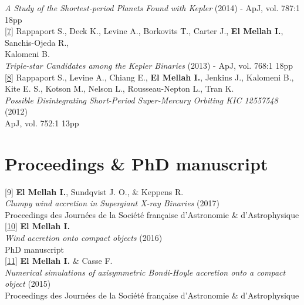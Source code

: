 \begin{flushleft}
\emph{A Study of the Shortest-period Planets Found with Kepler} (2014) - ApJ, vol. 787:1 18pp\\ 
\vspace*{0.3cm}
\href{http://iopscience.iop.org/article/10.1088/0004-637X/768/1/33/meta}{[7]} Rappaport S., Deck K., Levine A., Borkovits T., Carter J., \textbf{El Mellah I.}, Sanchis-Ojeda R., \\ Kalomeni B.\\ 
\emph{Triple-star Candidates among the Kepler Binaries} (2013) - ApJ, vol. 768:1 18pp\\
\vspace*{0.3cm}
\href{http://iopscience.iop.org/article/10.1088/0004-637X/752/1/1}{[8]} Rappaport S., Levine A., Chiang E., \textbf{El Mellah I.}, Jenkins J., Kalomeni B.,\\
Kite E. S., Kotson M., Nelson L., Rousseau-Nepton L., Tran K. \\ 
\emph{Possible Disintegrating Short-Period Super-Mercury Orbiting KIC 12557548} (2012)\\
ApJ, vol. 752:1 13pp \\

\end{flushleft}

\section*{Proceedings \& PhD manuscript}

\begin{flushleft}

[9] \textbf{El Mellah I.}, Sundqvist J. O., \& Keppens R. \\ 
\emph{Clumpy wind accretion in Supergiant X-ray Binaries} (2017)\\
Proceedings des Journ\'ees de la Soci\'et\'e fran\c caise d'Astronomie \& d'Astrophysique\\
\vspace*{0.3cm}
\href{http://adsabs.harvard.edu/abs/2017arXiv170709165E}{[10]} \textbf{El Mellah I.}\\ 
\emph{Wind accretion onto compact objects} (2016)\\
PhD manuscript\\
\vspace*{0.3cm}
\href{http://adsabs.harvard.edu/abs/2015sf2a.conf..325E}{[11]} \textbf{El Mellah I.} \& Casse F. \\ 
\emph{Numerical simulations of axisymmetric Bondi-Hoyle accretion onto a compact object} (2015)\\
Proceedings des Journ\'ees de la Soci\'et\'e fran\c caise d'Astronomie \& d'Astrophysique\\
\vspace*{0.3cm}

\end{flushleft}

